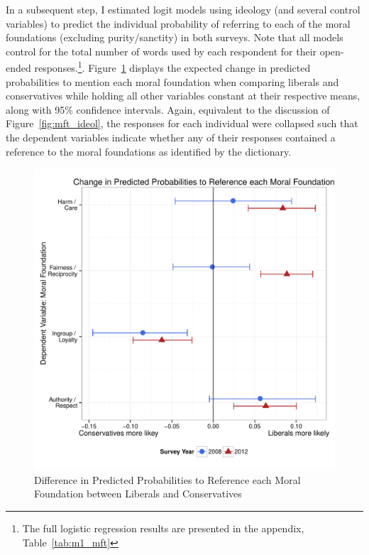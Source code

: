 \documentclass[12pt]{article}
\begin{document}
In a subsequent step, I estimated logit models using ideology (and several control variables) to predict the individual probability of referring to each of the moral foundations (excluding purity/sanctity) in both surveys. Note that all models control for the total number of words used by each respondent for their open-ended responses.\footnote{The full logistic regression results are presented in the appendix, Table~\ref{tab:m1_mft}}. Figure~\ref{fig:m1_mft} displays the expected change in predicted probabilities to mention each moral foundation when comparing liberals and conservatives while holding all other variables constant at their respective means, along with 95\% confidence intervals. Again, equivalent to the discussion of Figure~\ref{fig:mft_ideol}, the responses for each individual were collapsed such that the dependent variables indicate whether any of their responses contained a reference to the moral foundations as identified by the dictionary. 

\begin{figure}\centering
\includegraphics[scale=.5]{../calc/fig/m1_mft.pdf}
\caption{Difference in Predicted Probabilities to Reference each Moral Foundation between Liberals and Conservatives}\label{fig:m1_mft}
\end{figure}
\end{document}
